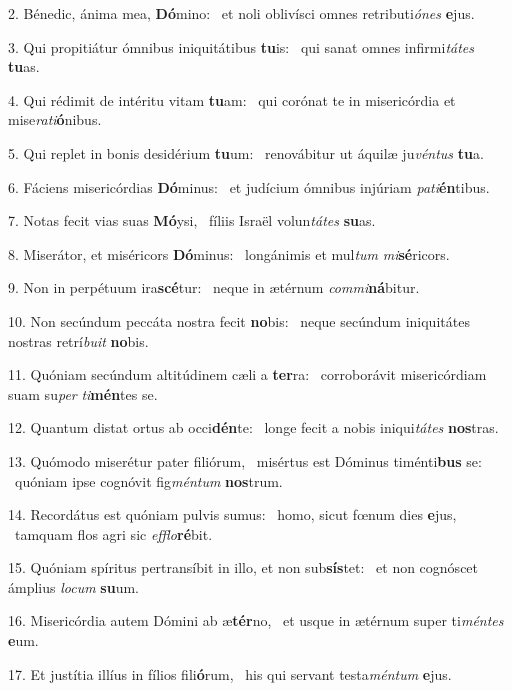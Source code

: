 2. Bénedic, ánima mea, \textbf{Dó}mino: \ast\  et noli oblivísci omnes retributi\textit{ó}\textit{nes} \textbf{e}jus.\

3. Qui propitiátur ómnibus iniquitátibus \textbf{tu}is: \ast\  qui sanat omnes infirmi\textit{tá}\textit{tes} \textbf{tu}as.\

4. Qui rédimit de intéritu vitam \textbf{tu}am: \ast\  qui corónat te in misericórdia et mise\textit{ra}\textit{ti}\textbf{ó}nibus.\

5. Qui replet in bonis desidérium \textbf{tu}um: \ast\  renovábitur ut áquilæ ju\textit{vén}\textit{tus} \textbf{tu}a.\

6. Fáciens misericórdias \textbf{Dó}minus: \ast\  et judícium ómnibus injúriam \textit{pa}\textit{ti}\textbf{én}tibus.\

7. Notas fecit vias suas \textbf{Mó}ysi, \ast\  fíliis Israël volun\textit{tá}\textit{tes} \textbf{su}as.\

8. Miserátor, et miséricors \textbf{Dó}minus: \ast\  longánimis et mul\textit{tum} \textit{mi}\textbf{sé}ricors.\

9. Non in perpétuum ira\textbf{scé}tur: \ast\  neque in ætérnum \textit{com}\textit{mi}\textbf{ná}bitur.\

10. Non secúndum peccáta nostra fecit \textbf{no}bis: \ast\  neque secúndum iniquitátes nostras retrí\textit{bu}\textit{it} \textbf{no}bis.\

11. Quóniam secúndum altitúdinem cæli a \textbf{ter}ra: \ast\  corroborávit misericórdiam suam su\textit{per} \textit{ti}\textbf{mén}tes se.\

12. Quantum distat ortus ab occi\textbf{dén}te: \ast\  longe fecit a nobis iniqui\textit{tá}\textit{tes} \textbf{nos}tras.\

13. Quómodo miserétur pater filiórum, \dag\  misértus est Dóminus timénti\textbf{bus} se: \ast\  quóniam ipse cognóvit fig\textit{mén}\textit{tum} \textbf{nos}trum.\

14. Recordátus est quóniam pulvis sumus: \dag\  homo, sicut fœnum dies \textbf{e}jus, \ast\  tamquam flos agri sic \textit{ef}\textit{flo}\textbf{ré}bit.\

15. Quóniam spíritus pertransíbit in illo, et non sub\textbf{sís}tet: \ast\  et non cognóscet ámplius \textit{lo}\textit{cum} \textbf{su}um.\

16. Misericórdia autem Dómini ab æ\textbf{tér}no, \ast\  et usque in ætérnum super ti\textit{mén}\textit{tes} \textbf{e}um.\

17. Et justítia illíus in fílios fili\textbf{ó}rum, \ast\  his qui servant testa\textit{mén}\textit{tum} \textbf{e}jus.\

